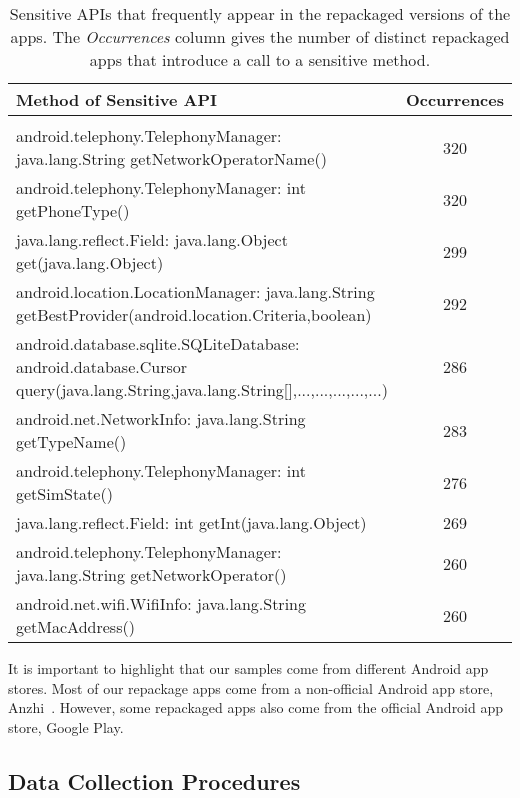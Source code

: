 \begin{table*}[ht]
  \caption{Sensitive APIs that frequently appear in the repackaged versions of the apps. The
    \emph{Occurrences} column gives the number of distinct repackaged apps that introduce a call
  to a sensitive method.}
\centering
  \begin{tabular}{lc}

    \hline
    Method of Sensitive API & Occurrences \\
    \hline \\
    android.telephony.TelephonyManager: java.lang.String getNetworkOperatorName() &  320\\
    android.telephony.TelephonyManager: int getPhoneType() &  320 \\
    java.lang.reflect.Field: java.lang.Object get(java.lang.Object) &  299 \\
    android.location.LocationManager: java.lang.String getBestProvider(android.location.Criteria,boolean) &  292 \\
    android.database.sqlite.SQLiteDatabase: android.database.Cursor query(java.lang.String,java.lang.String[],...,...,...,...,...) &  286 \\
    android.net.NetworkInfo: java.lang.String getTypeName() &  283\\
    android.telephony.TelephonyManager: int getSimState() &	276\\
    java.lang.reflect.Field: int getInt(java.lang.Object) &  269\\
    
    android.telephony.TelephonyManager: java.lang.String getNetworkOperator() &  260\\
    android.net.wifi.WifiInfo: java.lang.String getMacAddress()	& 260


    
\\\hline
\end{tabular}
\label{tab:APIused}
\end{table*}

It is important to highlight that our samples come from different Android app stores. Most of our repackage apps come from a non-official
Android app store, Anzhi~\cite{anzhi}. However, some repackaged apps also come from the official Android app store, Google Play.


\subsection{Data Collection Procedures} \label{sec:dataCollectionProc}

